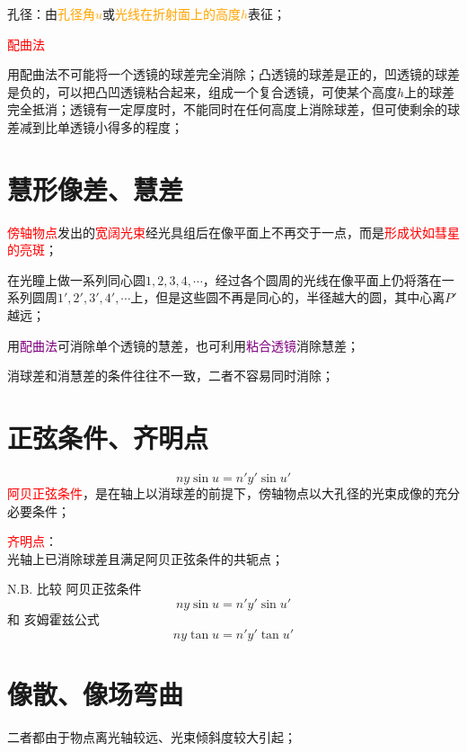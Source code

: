 \documentclass[12pt,a4paper]{article}
\begin{document}
孔径：由\textcolor{orange}{孔径角$u$}或\textcolor{orange}{光线在折射面上的高度$h$}表征；

\textcolor{red}{配曲法}

用配曲法不可能将一个透镜的球差完全消除；凸透镜的球差是正的，凹透镜的球差是负的，可以把凸凹透镜粘合起来，组成一个复合透镜，可使某个高度$h$上的球差完全抵消；透镜有一定厚度时，不能同时在任何高度上消除球差，但可使剩余的球差减到比单透镜小得多的程度；


\section{慧形像差、慧差}
\textcolor{red}{傍轴物点}发出的\textcolor{red}{宽阔光束}经光具组后在像平面上不再交于一点，而是\textcolor{red}{形成状如彗星的亮斑}；

在光瞳上做一系列同心圆$1, 2, 3, 4, \cdots$，经过各个圆周的光线在像平面上仍将落在一系列圆周$1', 2', 3', 4', \cdots$上，但是这些圆不再是同心的，半径越大的圆，其中心离$P'$越远；

用\textcolor{purple}{配曲法}可消除单个透镜的慧差，也可利用\textcolor{purple}{粘合透镜}消除慧差；

消球差和消慧差的条件往往不一致，二者不容易同时消除；



\section{正弦条件、齐明点}


\begin{equation}
ny\sin u = n' y' \sin u'
\end{equation}
\textcolor{red}{阿贝正弦条件}，是在轴上以消球差的前提下，傍轴物点以大孔径的光束成像的充分必要条件；

\textcolor{red}{齐明点}：\\
光轴上已消除球差且满足阿贝正弦条件的共轭点；


N.B. 比较
阿贝正弦条件
\begin{equation}
ny\sin u = n' y' \sin u'
\end{equation}
和
亥姆霍兹公式
\begin{equation}
ny\tan u = n' y' \tan u'
\end{equation}


\section{像散、像场弯曲}
二者都由于物点离光轴较远、光束倾斜度较大引起；
\end{document}
